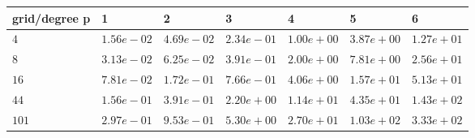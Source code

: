 \begin{tabular}{lllllll}
\hline
 grid/degree p   & 1          & 2          & 3          & 4          & 5          & 6          \\
\hline
 $4$             & $1.56e-02$ & $4.69e-02$ & $2.34e-01$ & $1.00e+00$ & $3.87e+00$ & $1.27e+01$ \\
 $8$             & $3.13e-02$ & $6.25e-02$ & $3.91e-01$ & $2.00e+00$ & $7.81e+00$ & $2.56e+01$ \\
 $16$            & $7.81e-02$ & $1.72e-01$ & $7.66e-01$ & $4.06e+00$ & $1.57e+01$ & $5.13e+01$ \\
 $44$            & $1.56e-01$ & $3.91e-01$ & $2.20e+00$ & $1.14e+01$ & $4.35e+01$ & $1.43e+02$ \\
 $101$           & $2.97e-01$ & $9.53e-01$ & $5.30e+00$ & $2.70e+01$ & $1.03e+02$ & $3.33e+02$ \\
\hline
\end{tabular}